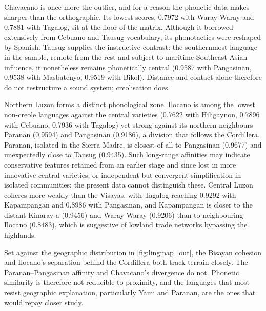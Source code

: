 Chavacano is once more the outlier, and for a reason the phonetic data makes
sharper than the orthographic. Its lowest scores, 0.7972 with Waray-Waray and
0.7881 with Tagalog, sit at the floor of the matrix. Although it borrowed
extensively from Cebuano and Tausug vocabulary, its phonotactics were reshaped
by Spanish. Tausug supplies the instructive contrast: the southernmost language
in the sample, remote from the rest and subject to maritime Southeast Asian
influence, it nonetheless remains phonetically central (0.9587 with Pangasinan,
0.9538 with Masbatenyo, 0.9519 with Bikol). Distance and contact alone
therefore do not restructure a sound system; creolisation does.

Northern Luzon forms a distinct phonological zone. Ilocano is among the lowest
non-creole languages against the central varieties (0.7622 with Hiligaynon,
0.7896 with Cebuano, 0.7936 with Tagalog) yet strong against its northern
neighbours Paranan (0.9594) and Pangasinan (0.9186), a division that follows
the Cordillera. Paranan, isolated in the Sierra Madre, is closest of all to
Pangasinan (0.9677) and unexpectedly close to Tausug (0.9435). Such long-range
affinities may indicate conservative features retained from an earlier stage
and since lost in more innovative central varieties, or independent but
convergent simplification in isolated communities; the present data cannot
distinguish these. Central Luzon coheres more weakly than the Visayas, with
Tagalog reaching 0.9292 with Kapampangan and 0.8986 with Pangasinan, and
Kapampangan is closer to the distant Kinaray-a (0.9456) and Waray-Waray
(0.9206) than to neighbouring Ilocano (0.8483), which is suggestive of lowland
trade networks bypassing the highlands.

Set against the geographic distribution in \cref{fig:lingmap_out}, the Bisayan
cohesion and Ilocano's separation behind the Cordillera both track terrain
closely. The Paranan--Pangasinan affinity and Chavacano's divergence do not.
Phonetic similarity is therefore not reducible to proximity, and the languages
that most resist geographic explanation, particularly Yami and Paranan, are the
ones that would repay closer study.